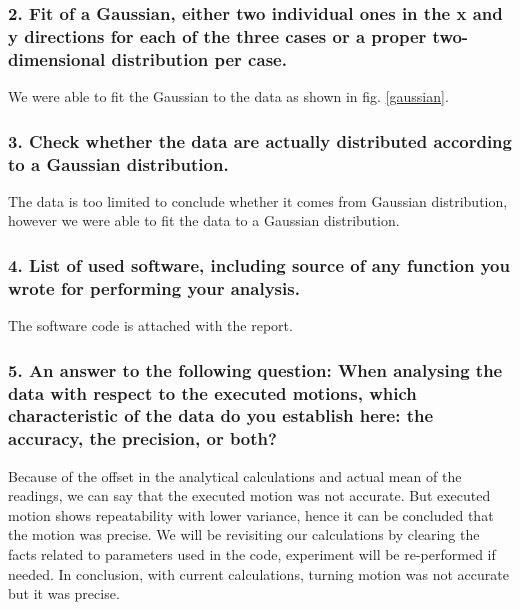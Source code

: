\documentclass[11pt,a4paper,openright,twoside]{extreport}
\begin{document}
\subsubsection*{2. Fit of a Gaussian, either two individual ones in the x and y directions for each of the three cases or a proper two-dimensional distribution per case.}
We were able to fit the Gaussian to the data as shown in fig. \ref{gaussian}.

\subsubsection*{3. Check whether the data are actually distributed according to a Gaussian distribution.}
The data is too limited to conclude whether it comes from Gaussian distribution, however we were able to fit the data to a Gaussian distribution.

\subsubsection*{4. List of used software, including source of any function you wrote for performing your analysis.}
The software code is attached with the report.

\subsubsection*{5. An answer to the following question: When analysing the data with respect to the executed motions, which characteristic of the data do you establish here: the accuracy, the precision, or both?}

Because of the offset in the analytical calculations and actual mean of the readings, we can say that the executed motion was not accurate. But executed motion shows repeatability with lower variance, hence it can be concluded that the motion was precise. We will be revisiting our calculations by clearing the facts related to parameters used in the code, experiment will be re-performed if needed. In conclusion, with current calculations, turning motion was not accurate but it was precise. 
\end{document}
